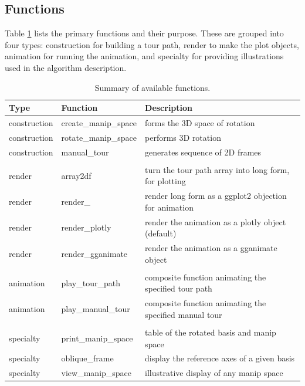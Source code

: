 \documentclass{template/monashthesis}
\begin{document}
\hypertarget{functions}{%
\subsection{Functions}\label{functions}}

Table \ref{tab:functionsTable} lists the primary functions and their purpose. These are grouped into four types: construction for building a tour path, render to make the plot objects, animation for running the animation, and specialty for providing illustrations used in the algorithm description.

\begin{table}

\caption{\label{tab:functionsTable}Summary of available functions.}
\centering
\begin{tabular}[t]{lll}
\toprule
Type & Function & Description\\
\midrule
construction & create\_manip\_space & forms the 3D space of rotation\\
construction & rotate\_manip\_space & performs 3D rotation\\
construction & manual\_tour & generates sequence of 2D frames\\
 &  & \\
render & array2df & turn the tour path array into long form, for plotting\\
render & render\_ & render long form as a ggplot2 objection for animation\\
render & render\_plotly & render the animation as a plotly object (default)\\
render & render\_gganimate & render the animation as a gganimate object\\
 &  & \\
animation & play\_tour\_path & composite function animating the specified tour path\\
animation & play\_manual\_tour & composite function animating the specified manual tour\\
 &  & \\
specialty & print\_manip\_space & table of the rotated basis and manip space\\
specialty & oblique\_frame & display the reference axes of a given basis\\
specialty & view\_manip\_space & illustrative display of any manip space\\
\bottomrule
\end{tabular}
\end{table}
\end{document}
